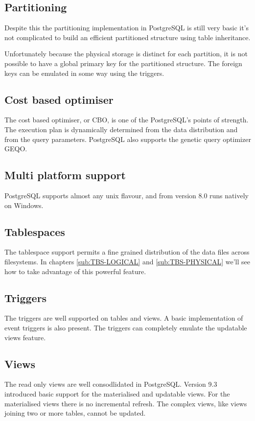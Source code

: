 \subsection{Partitioning}
Despite this the partitioning implementation in
PostgreSQL is still very basic it's not complicated to build an efficient partitioned structure
using
table inheritance.\newline

Unfortunately because the physical storage is distinct for each partition, it is not possible to
have a global primary key for the partitioned structure. The foreign keys can be emulated in some
way using the triggers.

\subsection{Cost based optimiser}
The cost based optimiser, or CBO, is one of the PostgreSQL's
points of strength. The execution plan is dynamically determined from the data distribution and from
the query parameters. PostgreSQL also supports the genetic query optimizer GEQO.


\subsection{Multi platform support}
PostgreSQL supports almost any unix flavour, and from version 8.0 runs natively on
Windows.

\subsection{Tablespaces}
The tablespace support permits a fine grained distribution of the data files across
filesystems. In chapters \ref{sub:TBS-LOGICAL} and \ref{sub:TBS-PHYSICAL} we'll see how to take advantage of
this powerful feature.

\subsection{Triggers}
The triggers are well supported on tables and views. A basic implementation of event
triggers is also present. The triggers can completely emulate the updatable views feature.

\subsection{Views}
The read only views are well consodlidated in PostgreSQL.
Version 9.3 introduced basic support for the materialised and updatable views.
For the materialised views there is no incremental refresh. The complex views, like views
joining two or more tables, cannot be updated.

